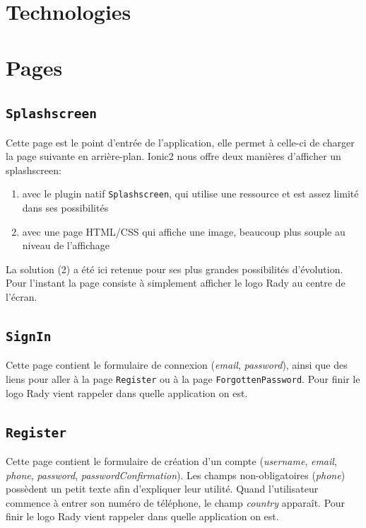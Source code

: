 \documentclass[french]{article}
\begin{document}
	\section{Technologies}
		
	\section{Pages}
		
		\subsection{\texttt{Splashscreen}}
			Cette page est le point d'entrée de l'application, elle permet à celle-ci de charger la page suivante en arrière-plan. Ionic2 nous offre deux manières d'afficher un splashscreen:
			\begin{enumerate}
				\item avec le plugin natif \texttt{Splashscreen}, qui utilise une ressource et est assez limité dans ses possibilités
				\item avec une page HTML/CSS qui affiche une image, beaucoup plus souple au niveau de l'affichage
			\end{enumerate}
			La solution (2) a été ici retenue pour ses plus grandes possibilités d'évolution.\\
			
			Pour l'instant la page consiste à simplement afficher le logo Rady au centre de l'écran.
			
		\subsection{\texttt{SignIn}}
			Cette page contient le formulaire de connexion (\textit{email}, \textit{password}), ainsi que des liens pour aller à la page \texttt{Register} ou à la page \texttt{ForgottenPassword}. Pour finir le logo Rady vient rappeler dans quelle application on est.
		
		\subsection{\texttt{Register}}
			Cette page contient le formulaire de création d'un compte (\textit{username}, \textit{email}, \textit{phone}, \textit{password}, \textit{passwordConfirmation}). Les champs non-obligatoires (\textit{phone}) possèdent un petit texte afin d'expliquer leur utilité. Quand l'utilisateur commence à entrer son numéro de téléphone, le champ \textit{country} apparaît. Pour finir le logo Rady vient rappeler dans quelle application on est. 
			
\end{document}
